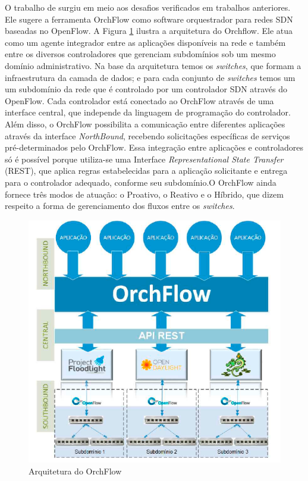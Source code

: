 O trabalho de  surgiu em meio aos desafios verificados em trabalhos anteriores. Ele sugere a ferramenta OrchFlow como software orquestrador para redes SDN baseadas no OpenFlow. 
  A Figura \ref{orchflow} ilustra a arquitetura do Orchflow. Ele atua como um agente integrador entre as aplicações disponíveis na rede e também entre os diversos controladores que gerenciam subdomínios sob um mesmo domínio administrativo. Na base da arquitetura temos os \emph{switches}, que formam a infraestrutura da camada de dados; e para cada conjunto de \emph{switches} temos um um subdomínio da rede que é controlado por um controlador SDN através do OpenFlow. Cada controlador está conectado ao OrchFlow através de uma interface central, que independe da linguagem de programação do controlador. Além disso, o OrchFlow possibilita a comunicação entre diferentes aplicações através da interface \emph{NorthBound}, recebendo solicitações específicas de serviços pré-determinados pelo OrchFlow. Essa integração entre aplicações e controladores só é possível porque utiliza-se uma Interface \emph{Representational State Transfer} (REST), que aplica regras estabelecidas para a aplicação solicitante e entrega para o controlador adequado, conforme seu subdomínio.O OrchFlow ainda fornece três modos de atuação: o Proativo, o Reativo e o Híbrido, que dizem respeito a forma de gerenciamento dos fluxos entre os \emph{switches}.
  
\begin{figure}[!h]
	\caption{ Arquitetura do OrchFlow}
  \centering
  \includegraphics[scale= 0.8] {Imagens/orchflow.PNG} 
 
  \label{orchflow}
\end{figure}

